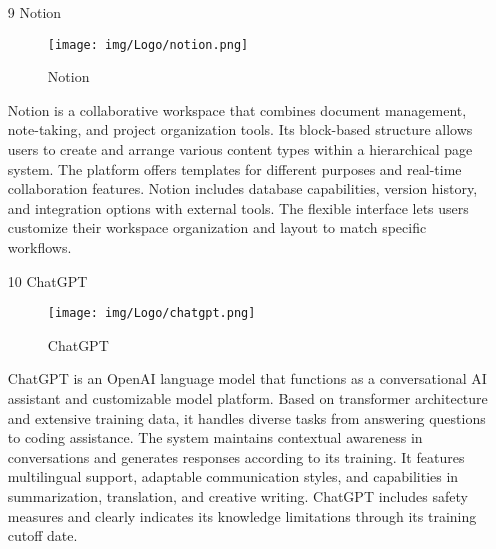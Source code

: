 \documentclass[conference]{IEEEtran}
\begin{document}
\begin{enumerate}
    \item[9] Notion\par
    \vspace{0.3em}
    \begin{figure}[h]
    \centering
    \texttt{[image: img/Logo/notion.png]}
    \centering
    \caption{Notion} 
    \end{figure}\par
    \vspace{0.3em}
    Notion is a collaborative workspace that combines document management, note-taking, and project organization tools. Its block-based structure allows users to create and arrange various content types within a hierarchical page system. The platform offers templates for different purposes and real-time collaboration features. Notion includes database capabilities, version history, and integration options with external tools. The flexible interface lets users customize their workspace organization and layout to match specific workflows.

    \vspace{1em}
    \newpage

    \item[10] ChatGPT\par
    \vspace{0.3em}
    \begin{figure}[h]
    \centering
    \texttt{[image: img/Logo/chatgpt.png]}
    \centering
    \caption{ChatGPT} 
    \end{figure}\par
    \vspace{0.3em}
    ChatGPT is an OpenAI language model that functions as a conversational AI assistant and customizable model platform. Based on transformer architecture and extensive training data, it handles diverse tasks from answering questions to coding assistance. The system maintains contextual awareness in conversations and generates responses according to its training. It features multilingual support, adaptable communication styles, and capabilities in summarization, translation, and creative writing. ChatGPT includes safety measures and clearly indicates its knowledge limitations through its training cutoff date.

    \vspace{1em}


\end{enumerate}
\end{document}
